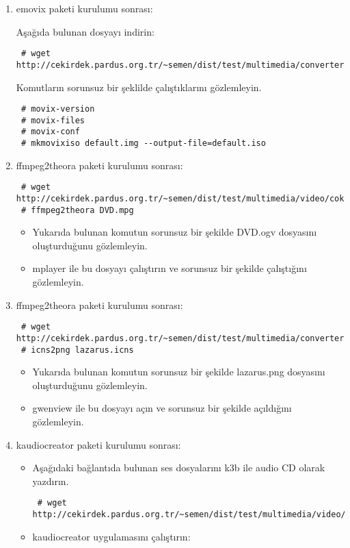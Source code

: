 \documentclass[a4paper,10pt]{article}
\begin{document}
\begin{enumerate}
\begin{itemize}
\end{itemize}
\item emovix paketi kurulumu sonrası:

Aşağıda bulunan dosyayı indirin:
\begin{verbatim}
 # wget http://cekirdek.pardus.org.tr/~semen/dist/test/multimedia/converter/default.img
\end{verbatim}
 
Komutların sorunsuz bir şeklilde çalıştıklarını gözlemleyin.
\begin{verbatim}
 # movix-version
 # movix-files
 # movix-conf
 # mkmovixiso default.img --output-file=default.iso
\end{verbatim}

\item ffmpeg2theora paketi kurulumu sonrası:
\begin{verbatim}
 # wget http://cekirdek.pardus.org.tr/~semen/dist/test/multimedia/video/cokluortam/DVD.mpg
 # ffmpeg2theora DVD.mpg
\end{verbatim}
\begin{itemize}
 \item Yukarıda bulunan komutun sorunsuz bir şekilde DVD.ogv dosyasını oluşturduğunu gözlemleyin.
 \item mplayer ile bu dosyayı çalıştırın ve sorunsuz bir şekilde çalıştığını gözlemleyin.
\end{itemize}
\item ffmpeg2theora paketi kurulumu sonrası:
\begin{verbatim}
 # wget http://cekirdek.pardus.org.tr/~semen/dist/test/multimedia/converter/lazarus.png
 # icns2png lazarus.icns
\end{verbatim}
\begin{itemize}
 \item Yukarıda bulunan komutun sorunsuz bir şekilde lazarus.png dosyasını oluşturduğunu gözlemleyin.
 \item gwenview ile bu dosyayı açın ve sorunsuz bir şekilde açıldığını gözlemleyin.
\end{itemize}
\item kaudiocreator paketi kurulumu sonrası:
\begin{itemize}
 \item Aşağıdaki bağlantıda bulunan ses dosyalarını k3b ile audio CD olarak yazdırın.
\begin{verbatim}
 # wget http://cekirdek.pardus.org.tr/~semen/dist/test/multimedia/video/cokluortam/
\end{verbatim}
 \item kaudiocreator uygulamasını çalıştırın:


\end{itemize}
\end{enumerate}
\end{document}
